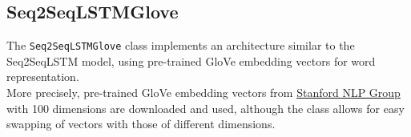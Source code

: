 \subsection{Seq2SeqLSTMGlove}
The \texttt{Seq2SeqLSTMGlove} class implements an architecture similar to the Seq2SeqLSTM model, using pre-trained GloVe embedding vectors for word representation.\\
More precisely, pre-trained GloVe embedding vectors from \href{https://nlp.stanford.edu/projects/glove/}{Stanford NLP Group} with 100 dimensions are downloaded and used, although the class allows for easy swapping of vectors with those of different dimensions.\\


